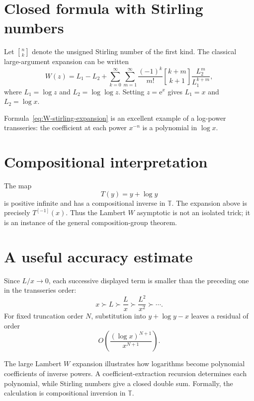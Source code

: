 \documentclass[11pt,oneside]{book}
\theoremstyle{definition}
\theoremstyle{remark}
\newcommand{\T}{\mathbb{T}}
\newcommand{\e}{\mathrm{e}}
\newcommand{\bigO}{O}
\newcommand{\succdom}{\succ}
\begin{document}
\section{Closed formula with Stirling numbers}

Let $\genfrac{[}{]}{0pt}{}{n}{k}$ denote the unsigned Stirling number of the first kind. The
classical large-argument expansion can be written
\begin{equation}
  W(z)=L_1-L_2+
  \sum_{k=0}^{\infty}\sum_{m=1}^{\infty}
   \frac{(-1)^k}{m!}
   \genfrac{[}{]}{0pt}{}{k+m}{k+1}
   \frac{L_2^m}{L_1^{k+m}},
  \label{eq:W-stirling-expansion}
\end{equation}
where $L_1=\log z$ and $L_2=\log\log z$. Setting $z=\e^x$ gives
$L_1=x$ and $L_2=\log x$.

Formula~\eqref{eq:W-stirling-expansion} is an excellent example of a log-power
transseries: the coefficient at each power $x^{-n}$ is a polynomial in
$\log x$.

\section{Compositional interpretation}

The map
\[
  T(y)=y+\log y
\]
is positive infinite and has a compositional inverse in $\T$. The expansion
above is precisely $T^{[-1]}(x)$. Thus the Lambert $W$ asymptotic is not an
isolated trick; it is an instance of the general composition-group theorem.

\section{A useful accuracy estimate}

Since $L/x\to0$, each successive displayed term is smaller than the preceding
one in the transseries order:
\[
  x\succdom L\succdom \frac{L}{x}
  \succdom\frac{L^2}{x^2}\succdom\cdots.
\]
For fixed truncation order $N$, substitution into
$y+\log y-x$ leaves a residual of order
\[
  \bigO\left(\frac{(\log x)^{N+1}}{x^{N+1}}\right).
\]

\begin{summarybox}
The large Lambert $W$ expansion illustrates how logarithms become polynomial
coefficients of inverse powers. A coefficient-extraction recursion determines
each polynomial, while Stirling numbers give a closed double sum. Formally, the
calculation is compositional inversion in $\T$.
\end{summarybox}
\end{document}
